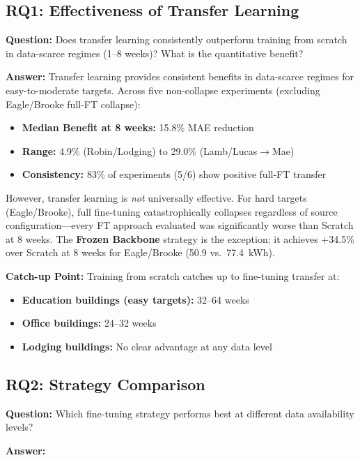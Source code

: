 \documentclass[12pt,a4paper]{report}
\begin{document}
\subsection{RQ1: Effectiveness of Transfer Learning}

\textbf{Question:} Does transfer learning consistently outperform training from scratch in data-scarce regimes (1--8 weeks)? What is the quantitative benefit?

\textbf{Answer:} Transfer learning provides consistent benefits in data-scarce regimes for easy-to-moderate targets. Across five non-collapse experiments (excluding Eagle/Brooke full-FT collapse):

\begin{itemize}
    \item \textbf{Median Benefit at 8 weeks:} 15.8\% MAE reduction
    \item \textbf{Range:} 4.9\% (Robin/Lodging) to 29.0\% (Lamb/Lucas$\to$Mae)
    \item \textbf{Consistency:} 83\% of experiments (5/6) show positive full-FT transfer
\end{itemize}

However, transfer learning is \textit{not} universally effective. For hard targets (Eagle/Brooke), full fine-tuning catastrophically collapses regardless of source configuration---every FT approach evaluated was significantly worse than Scratch at 8 weeks. The \textbf{Frozen Backbone} strategy is the exception: it achieves +34.5\% over Scratch at 8 weeks for Eagle/Brooke (50.9 vs.\ 77.4~kWh).

\textbf{Catch-up Point:} Training from scratch catches up to fine-tuning transfer at:
\begin{itemize}
    \item \textbf{Education buildings (easy targets):} 32--64 weeks
    \item \textbf{Office buildings:} 24--32 weeks
    \item \textbf{Lodging buildings:} No clear advantage at any data level
\end{itemize}

\subsection{RQ2: Strategy Comparison}

\textbf{Question:} Which fine-tuning strategy performs best at different data availability levels?

\textbf{Answer:}
\end{document}
